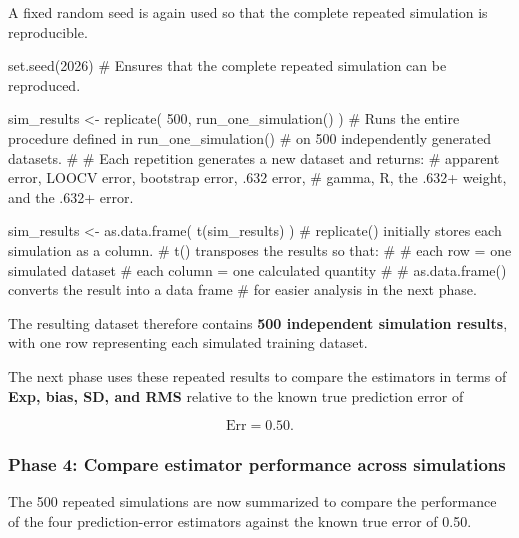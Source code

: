 \documentclass[
  letterpaper,
  DIV=11,
  numbers=noendperiod]{scrreprt}
\newenvironment{Shaded}{\begin{snugshade}}{\end{snugshade}}
\newcommand{\CommentTok}[1]{\textcolor[rgb]{0.37,0.37,0.37}{#1}}
\newcommand{\DecValTok}[1]{\textcolor[rgb]{0.68,0.00,0.00}{#1}}
\newcommand{\FunctionTok}[1]{\textcolor[rgb]{0.28,0.35,0.67}{#1}}
\newcommand{\NormalTok}[1]{\textcolor[rgb]{0.00,0.23,0.31}{#1}}
\newcommand{\OtherTok}[1]{\textcolor[rgb]{0.00,0.23,0.31}{#1}}
\begin{document}
A fixed random seed is again used so that the complete repeated
simulation is reproducible.

\begin{Shaded}
\begin{Highlighting}[]
\FunctionTok{set.seed}\NormalTok{(}\DecValTok{2026}\NormalTok{)}
\CommentTok{\# Ensures that the complete repeated simulation can be reproduced.}

\NormalTok{sim\_results }\OtherTok{\textless{}{-}} \FunctionTok{replicate}\NormalTok{(}
  \DecValTok{500}\NormalTok{,}
  \FunctionTok{run\_one\_simulation}\NormalTok{()}
\NormalTok{)}
\CommentTok{\# Runs the entire procedure defined in run\_one\_simulation()}
\CommentTok{\# on 500 independently generated datasets.}
\CommentTok{\#}
\CommentTok{\# Each repetition generates a new dataset and returns:}
\CommentTok{\# apparent error, LOOCV error, bootstrap error, .632 error,}
\CommentTok{\# gamma, R, the .632+ weight, and the .632+ error.}

\NormalTok{sim\_results }\OtherTok{\textless{}{-}} \FunctionTok{as.data.frame}\NormalTok{(}
  \FunctionTok{t}\NormalTok{(sim\_results)}
\NormalTok{)}
\CommentTok{\# replicate() initially stores each simulation as a column.}
\CommentTok{\# t() transposes the results so that:}
\CommentTok{\#}
\CommentTok{\# each row = one simulated dataset}
\CommentTok{\# each column = one calculated quantity}
\CommentTok{\#}
\CommentTok{\# as.data.frame() converts the result into a data frame}
\CommentTok{\# for easier analysis in the next phase.}
\end{Highlighting}
\end{Shaded}

The resulting dataset therefore contains \textbf{500 independent
simulation results}, with one row representing each simulated training
dataset.

The next phase uses these repeated results to compare the estimators in
terms of \textbf{Exp, bias, SD, and RMS} relative to the known true
prediction error of

\[
\mathrm{Err}=0.50.
\]

\subsubsection{Phase 4: Compare estimator performance across
simulations}\label{phase-4-compare-estimator-performance-across-simulations}

The 500 repeated simulations are now summarized to compare the
performance of the four prediction-error estimators against the known
true error of 0.50.
\end{document}
